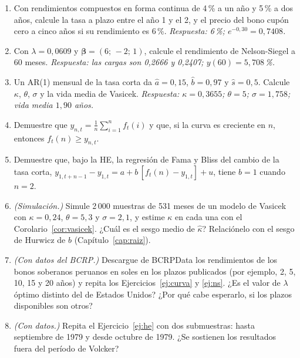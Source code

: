 \begin{enumerate}[label=\textbf{\thechapter.\arabic*},leftmargin=*,itemsep=6pt]
  \item Con rendimientos compuestos en forma continua de 4\,\% a un año y 5\,\% a dos años, calcule la tasa a plazo entre el año
  1 y el 2, y el precio del bono cupón cero a cinco años si su rendimiento es 6\,\%. \textit{Respuesta: 6\,\%; $e^{-0{,}30}=0{,}7408$.}

  \item Con $\lambda=0{,}0609$ y $\boldsymbol\beta=(6;\,-2;\,1)$, calcule el rendimiento de Nelson-Siegel a 60 meses.
  \textit{Respuesta: las cargas son 0,2666 y 0,2407; $y(60)=5{,}708$\,\%.}

  \item Un AR(1) mensual de la tasa corta da $\hat a=0{,}15$, $\hat b=0{,}97$ y $\hat s=0{,}5$. Calcule $\kappa$, $\theta$, $\sigma$ y la
  vida media de Vasicek. \textit{Respuesta: $\kappa=0{,}3655$; $\theta=5$; $\sigma=1{,}758$; vida media $1{,}90$ años.}

  \item Demuestre que $y_{n,t}=\frac1n\sum_{i=1}^n f_t(i)$ y que, si la curva es creciente en $n$, entonces $f_t(n)\ge y_{n,t}$.

  \item Demuestre que, bajo la HE, la regresión de Fama y Bliss del cambio de la tasa corta,
  $y_{1,t+n-1}-y_{1,t}=a+b\,[f_t(n)-y_{1,t}]+u$, tiene $b=1$ cuando $n=2$.

  \item \emph{(Simulación.)} Simule 2\,000 muestras de 531 meses de un modelo de Vasicek con $\kappa=0{,}24$, $\theta=5{,}3$ y
  $\sigma=2{,}1$, y estime $\kappa$ en cada una con el Corolario~\ref{cor:vasicek}. ¿Cuál es el sesgo medio de $\hat\kappa$? Relaciónelo
  con el sesgo de Hurwicz de $\hat b$ (Capítulo~\ref{cap:raiz}).

  \item \emph{(Con datos del BCRP.)} Descargue de BCRPData los rendimientos de los bonos soberanos peruanos en soles en los
  plazos publicados (por ejemplo, 2, 5, 10, 15 y 20 años) y repita los Ejercicios~\ref{ej:curva} y \ref{ej:ns}. ¿Es el valor de $\lambda$ óptimo distinto del de Estados
  Unidos? ¿Por qué cabe esperarlo, si los plazos disponibles son otros?

  \item \emph{(Con datos.)} Repita el Ejercicio~\ref{ej:he} con dos submuestras: hasta septiembre de 1979 y desde octubre de 1979. ¿Se
  sostienen los resultados fuera del período de Volcker?
\end{enumerate}

